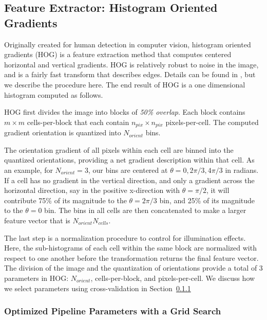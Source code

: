 \documentclass{emulateapj}
\newcommand{\wording}[1]{{\it\color{purple} #1}}
\begin{document}
\subsection{Feature Extractor: Histogram Oriented Gradients}\label{sec:hog}
Originally created for human detection in computer vision, histogram
oriented gradients (HOG) is a feature extraction method that computes
centered horizontal and vertical gradients. HOG is relatively robust
to noise in the image, and is a fairly fast transform that describes
edges.  Details can be found in \citet{dalalandtriggs_05}, but we
describe the procedure here.  The end result of HOG is a one
dimensional histogram computed as follows.

HOG first divides the image into blocks of \wording{50\% overlap}.
Each block contains $m\times m$ cells-per-block that each contain
$n_{pix}\times n_{pix}$ pixels-per-cell.  The computed gradient
orientation is quantized into $N_{orient}$ bins.

The orientation gradient of all pixels within each cell are binned
into the quantized orientations, providing a net gradient description
within that cell.  As an example, for $N_{orient}=3$, our bins are
centered at $\theta=0, 2\pi/3, 4\pi/3$ in radians.  If a cell has no
gradient in the vertical direction, and only a gradient across the
horizontal direction, say in the positive x-direction with
$\theta=\pi/2$, it will contribute 75\% of its magnitude to the
$\theta=2\pi/3$ bin, and 25\% of its magnitude to the $\theta=0$ bin.
The bins in all cells are then concatenated to make a larger feature
vector that is $N_{orient}$\times$N_{cells}$.

The last step is a normalization procedure to control for illumination
effects.  Here, the sub-histograms of each cell within the same block
are normalized with respect to one another before the transformation
returns the final feature vector.  The division of the image and the
quantization of orientations provide a total of 3 parameters in HOG:
$N_{orient}$, cells-per-block, and pixels-per-cell.  We discuss how we
select parameters using cross-validation in
Section~\ref{sec:gridsearch}

\subsubsection{Optimized Pipeline Parameters with a Grid Search}\label{sec:gridsearch}
\end{document}
